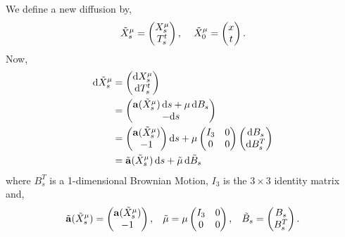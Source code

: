 \documentclass[a4paper,12pt,draft]{report}
\theoremstyle{remark}
\theoremstyle{definition}
\begin{document}
{
We define a new diffusion by,
$$
\tilde{X}_s^\mu = \begin{pmatrix} X_s^\mu \\  T_s^t \end{pmatrix}, \hspace{0.4cm} \tilde{X}_0^\mu = \begin{pmatrix} x \\ t\end{pmatrix}.
$$
Now,
\begin{align}
\mathrm{d}\tilde{X}_s^\mu & = \begin{pmatrix} \mathrm{d}X_s^\mu \\  \mathrm{d}T_s^t \end{pmatrix}\nonumber\\
& = \begin{pmatrix} \bold{a}(\tilde{X}_s^\mu)\,\mathrm{d}s + \mu\,\mathrm{d}B_s \\  -\mathrm{d}s\end{pmatrix}\nonumber\\
& = \begin{pmatrix} \bold{a}(\tilde{X}_s^\mu) \\ -1 \end{pmatrix}\mathrm{d}s + \mu\begin{pmatrix} I_3 & 0 \\ 0 & 0 \end{pmatrix}\begin{pmatrix} \mathrm{d}B_s \\ \mathrm{d}B_s^T \end{pmatrix}\nonumber\\
& = \tilde{\bold{a}}(\tilde{X}_s^\mu)\,\mathrm{d}s + \tilde{\mu}\,\mathrm{d}\tilde{B}_s\nonumber
\end{align}
where $B_s^T$ is a 1-dimensional Brownian Motion, $I_3$ is the $3 \times 3$ identity matrix and,
$$
\tilde{\bold{a}}(\tilde{X}_s^\mu) = \begin{pmatrix} \bold{a}(\tilde{X}_s^\mu) \\ -1 \end{pmatrix}, \hspace{0.3cm} \tilde{\mu} = \mu\begin{pmatrix} I_3 & 0 \\ 0 & 0 \end{pmatrix}, \hspace{0.3cm} \tilde{B}_s = \begin{pmatrix} B_s \\  B_s^T \end{pmatrix}.
$$}
\end{document}
